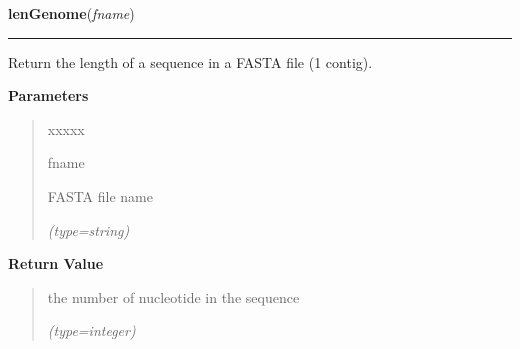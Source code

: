 \hspace{.8\funcindent}\begin{boxedminipage}{\funcwidth}

    \raggedright \textbf{lenGenome}(\textit{fname})

    \vspace{-1.5ex}

    \rule{\textwidth}{0.5\fboxrule}
\setlength{\parskip}{2ex}
    Return the length of a sequence in a FASTA file (1 contig).

\setlength{\parskip}{1ex}
      \textbf{Parameters}
      \vspace{-1ex}

      \begin{quote}
        \begin{Ventry}{xxxxx}

          \item[fname]

          FASTA file name

            {\it (type=string)}

        \end{Ventry}

      \end{quote}

      \textbf{Return Value}
    \vspace{-1ex}

      \begin{quote}
      the number of nucleotide in the sequence

      {\it (type=integer)}

      \end{quote}

    \end{boxedminipage}

    \label{script-BAMmaker:coverage}

    \vspace{0.5ex}

